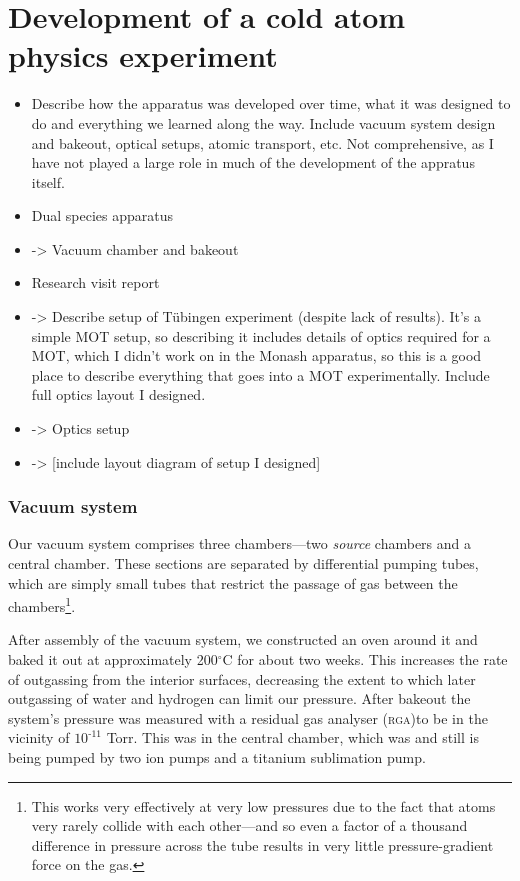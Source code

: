 
\chapter{Development of a cold atom physics experiment}
\begin{itemize}
\item Describe how the apparatus was developed over time, what it was designed to do and everything we learned along the way. Include vacuum system design and bakeout, optical setups, atomic transport, etc. Not comprehensive, as I have not played a large role in much of the development of the appratus itself.

\item Dual species apparatus
\item -> Vacuum chamber and bakeout
\item Research visit report
\item ->
    Describe setup of Tübingen experiment (despite lack of results). It's a simple MOT setup, so describing it includes details of optics required for a MOT, which I didn't work on in the Monash apparatus, so this is a good place to describe everything that goes into a MOT experimentally. Include full optics layout I designed.
    \item -> Optics setup
    \item -> [include layout diagram of setup I designed]
\end{itemize}

\subsection{Vacuum system}
Our vacuum system comprises three chambers---two \emph{source} chambers and a central chamber. These sections are separated by differential pumping tubes, which are simply small tubes that restrict the passage of gas between the chambers\footnote{This works very effectively at very low pressures due to the fact that atoms very rarely collide with each other---and so even a factor of a thousand difference in pressure across the tube results in very little pressure-gradient force on the gas.}.

After assembly of the vacuum system, we constructed an oven around it and baked it out at approximately 200$^\circ$C for about two weeks. This increases the rate of outgassing from the interior surfaces, decreasing the extent to which later outgassing of water and hydrogen can limit our pressure. After bakeout the system's pressure was measured with a residual gas analyser (\textsc{rga})to be in the vicinity of $10^{\textrm{{-11}}}$ Torr. This was in the central chamber, which was and still is being pumped by two ion pumps and a titanium sublimation pump.

